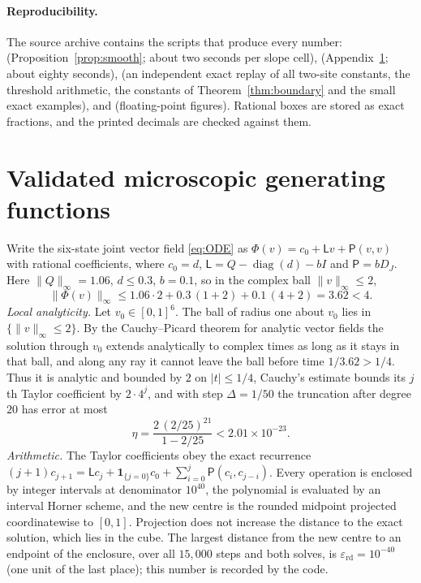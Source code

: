 \documentclass[11pt]{article}
\theoremstyle{remark}
\newcommand{\one}{\mathbf 1}
\newcommand{\diag}{\operatorname{diag}}
\begin{document}
\paragraph{Reproducibility.} The source archive contains the scripts that
produce every number:  (Proposition~\ref{prop:smooth};
about two seconds per slope cell), 
(Appendix~\ref{app:validation}; about eighty seconds),
 (an independent exact replay of all two-site constants,
the threshold arithmetic, the constants of Theorem~\ref{thm:boundary} and the
small exact examples),  and 
(floating-point figures). Rational boxes are stored as exact fractions, and
the printed decimals are checked against them.

\appendix
\section{Validated microscopic generating functions}\label{app:validation}

Write the six-state joint vector field \eqref{eq:ODE} as
$\Phi(v)=c_0+\mathsf Lv+\mathsf P(v,v)$ with rational coefficients, where
$c_0=d$, $\mathsf L=Q-\diag(d)-bI$ and $\mathsf P=bD_J$. Here
$\|Q\|_\infty=1.06$, $d\le0.3$, $b=0.1$, so in the complex ball
$\|v\|_\infty\le2$,
\[
 \|\Phi(v)\|_\infty\le1.06\cdot2+0.3\,(1+2)+0.1\,(4+2)=3.62<4 .
\]
\emph{Local analyticity.} Let $v_0\in[0,1]^6$. The ball of radius one about
$v_0$ lies in $\{\|v\|_\infty\le2\}$. By the Cauchy--Picard theorem for
analytic vector fields the solution through $v_0$ extends analytically to
complex times as long as it stays in that ball, and along any ray it cannot
leave the ball before time $1/3.62>1/4$. Thus it is analytic and bounded by
$2$ on $|t|\le1/4$, Cauchy's estimate bounds its $j$th Taylor coefficient by
$2\cdot4^j$, and with step $\Delta=1/50$ the truncation after degree $20$ has
error at most
\[
 \eta=\frac{2\,(2/25)^{21}}{1-2/25}<2.01\times10^{-23}.
\]
\emph{Arithmetic.} The Taylor coefficients obey the exact recurrence
$(j+1)c_{j+1}=\mathsf Lc_j+\one_{\{j=0\}}c_0+\sum_{i=0}^j\mathsf P(c_i,c_{j-i})$.
Every operation is enclosed by integer intervals at denominator $10^{40}$,
the polynomial is evaluated by an interval Horner scheme, and the new centre
is the rounded midpoint projected coordinatewise to $[0,1]$. Projection does
not increase the distance to the exact solution, which lies in the cube. The
largest distance from the new centre to an endpoint of the enclosure, over
all $15{,}000$ steps and both solves, is
$\varepsilon_{\mathrm{rd}}=10^{-40}$ (one unit of the last place); this number
is recorded by the code.
\end{document}
